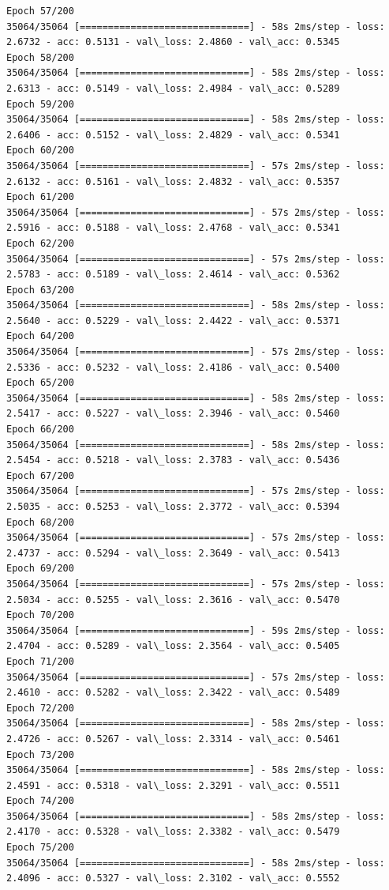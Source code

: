 \documentclass[11pt]{article}
\begin{document}
\begin{Verbatim}[commandchars=\\\{\}]
Epoch 57/200
35064/35064 [==============================] - 58s 2ms/step - loss: 2.6732 - acc: 0.5131 - val\_loss: 2.4860 - val\_acc: 0.5345
Epoch 58/200
35064/35064 [==============================] - 58s 2ms/step - loss: 2.6313 - acc: 0.5149 - val\_loss: 2.4984 - val\_acc: 0.5289
Epoch 59/200
35064/35064 [==============================] - 58s 2ms/step - loss: 2.6406 - acc: 0.5152 - val\_loss: 2.4829 - val\_acc: 0.5341
Epoch 60/200
35064/35064 [==============================] - 57s 2ms/step - loss: 2.6132 - acc: 0.5161 - val\_loss: 2.4832 - val\_acc: 0.5357
Epoch 61/200
35064/35064 [==============================] - 57s 2ms/step - loss: 2.5916 - acc: 0.5188 - val\_loss: 2.4768 - val\_acc: 0.5341
Epoch 62/200
35064/35064 [==============================] - 57s 2ms/step - loss: 2.5783 - acc: 0.5189 - val\_loss: 2.4614 - val\_acc: 0.5362
Epoch 63/200
35064/35064 [==============================] - 58s 2ms/step - loss: 2.5640 - acc: 0.5229 - val\_loss: 2.4422 - val\_acc: 0.5371
Epoch 64/200
35064/35064 [==============================] - 57s 2ms/step - loss: 2.5336 - acc: 0.5232 - val\_loss: 2.4186 - val\_acc: 0.5400
Epoch 65/200
35064/35064 [==============================] - 58s 2ms/step - loss: 2.5417 - acc: 0.5227 - val\_loss: 2.3946 - val\_acc: 0.5460
Epoch 66/200
35064/35064 [==============================] - 58s 2ms/step - loss: 2.5454 - acc: 0.5218 - val\_loss: 2.3783 - val\_acc: 0.5436
Epoch 67/200
35064/35064 [==============================] - 57s 2ms/step - loss: 2.5035 - acc: 0.5253 - val\_loss: 2.3772 - val\_acc: 0.5394
Epoch 68/200
35064/35064 [==============================] - 57s 2ms/step - loss: 2.4737 - acc: 0.5294 - val\_loss: 2.3649 - val\_acc: 0.5413
Epoch 69/200
35064/35064 [==============================] - 57s 2ms/step - loss: 2.5034 - acc: 0.5255 - val\_loss: 2.3616 - val\_acc: 0.5470
Epoch 70/200
35064/35064 [==============================] - 59s 2ms/step - loss: 2.4704 - acc: 0.5289 - val\_loss: 2.3564 - val\_acc: 0.5405
Epoch 71/200
35064/35064 [==============================] - 57s 2ms/step - loss: 2.4610 - acc: 0.5282 - val\_loss: 2.3422 - val\_acc: 0.5489
Epoch 72/200
35064/35064 [==============================] - 58s 2ms/step - loss: 2.4726 - acc: 0.5267 - val\_loss: 2.3314 - val\_acc: 0.5461
Epoch 73/200
35064/35064 [==============================] - 58s 2ms/step - loss: 2.4591 - acc: 0.5318 - val\_loss: 2.3291 - val\_acc: 0.5511
Epoch 74/200
35064/35064 [==============================] - 58s 2ms/step - loss: 2.4170 - acc: 0.5328 - val\_loss: 2.3382 - val\_acc: 0.5479
Epoch 75/200
35064/35064 [==============================] - 58s 2ms/step - loss: 2.4096 - acc: 0.5327 - val\_loss: 2.3102 - val\_acc: 0.5552

\end{Verbatim}
\end{document}
